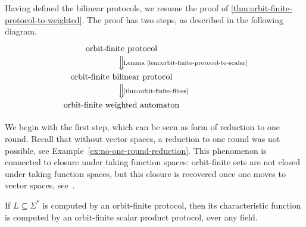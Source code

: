 Having defined the bilinear protocols, we resume the proof of \cref{thm:orbit-finite-protocol-to-weighted}. The proof has two steps, as described in the following diagram.
\[
\begin{tikzcd}
\text{orbit-finite protocol}
\ar[d,Rightarrow,"\text{Lemma~\ref{lem:orbit-finite-protocol-to-scalar}}"]
\\
\text{orbit-finite bilinear protocol}
\ar[d,Rightarrow, "\text{\cref{thm:orbit-finite-fliess}}"]
\\
\text{orbit-finite weighted automaton}
\end{tikzcd}
\]

We begin with the first step, which can be seen as form of reduction to one round. Recall that without vector spaces, a reduction to one round was not possible, see Example~\ref{ex:no-one-round-reduction}. This phenomenon is connected to closure under taking function spaces: orbit-finite sets are not closed under taking function spaces, but this closure is recovered once one moves to vector spaces, see~\cite[Section 8.3]{bojanczyk_slightly}. 

\begin{lemma}\label{lem:orbit-finite-protocol-to-scalar}
    If $L \subseteq \Sigma^*$ is computed by an orbit-finite protocol, then its characteristic function is computed by an orbit-finite scalar product protocol, over any field.
\end{lemma}


